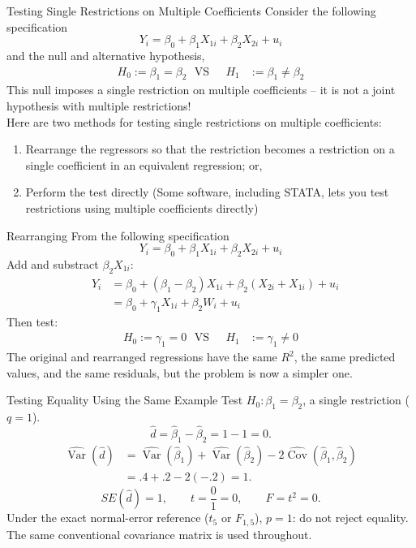 \documentclass[notes,10pt, aspectratio=169]{beamer}
\begin{document}
\begin{frame}{Testing Single Restrictions on Multiple Coefficients}
Consider the following specification
\begin{equation*}
    Y_i = \beta_0 + \beta_1 X_{1i}+ \beta_2 X_{2i} +u_i
\end{equation*}
and the null and alternative hypothesis,
\begin{eqnarray*}
    H_0 := \beta_1=\beta_2 \text{~~VS~~}  & H_1 &:= \beta_1\neq\beta_2
\end{eqnarray*}
This null imposes a single restriction on multiple coefficients – it is not a joint hypothesis with multiple restrictions!\\[1em]

Here are two methods for testing single restrictions on multiple coefficients:
\begin{enumerate}
    \item Rearrange the regressors so that the restriction becomes a restriction on a single coefficient in an equivalent regression; or,
    \item Perform the test directly (Some software, including STATA, lets you test restrictions using multiple coefficients directly)
\end{enumerate}
\end{frame}


\begin{frame}{Rearranging}
From the following specification
\begin{equation*}
    Y_i = \beta_0 + \beta_1 X_{1i}+ \beta_2 X_{2i} +u_i
\end{equation*}
Add and substract $ \beta_2 X_{1i}$:
\begin{eqnarray*}
    &Y_i &= \beta_0 + (\beta_1 - \beta_2)X_{1i}+ \beta_2 (X_{2i} + X_{1i}) +u_i\\
    & &= \beta_0 + \gamma_1 X_{1i}+ \beta_2 W_{i} +u_i
\end{eqnarray*}
Then test:
\begin{eqnarray*}
    H_0 := \gamma_1=0 \text{~~VS~~}  & H_1 &:= \gamma_1\neq 0
\end{eqnarray*}
The original and rearranged regressions have the same $R^2$, the same predicted values, and the same residuals, but the problem is now a simpler one.
\end{frame}


\begin{frame}{Testing Equality Using the Same Example}
Test $H_0:\beta_1=\beta_2$, a single restriction ($q=1$).
\[\hat d=\hat\beta_1-\hat\beta_2=1-1=0.\]
\begin{align*}
\widehat{\operatorname{Var}}(\hat d)
&=\widehat{\operatorname{Var}}(\hat\beta_1)+\widehat{\operatorname{Var}}(\hat\beta_2)
-2\widehat{\operatorname{Cov}}(\hat\beta_1,\hat\beta_2)\\
&=.4+.2-2(-.2)=1.
\end{align*}
\[SE(\hat d)=1,\qquad t=\frac01=0,\qquad F=t^2=0.\]
Under the exact normal-error reference ($t_5$ or $F_{1,5}$), $p=1$: do not reject equality. The same conventional covariance matrix is used throughout.
\end{frame}
\end{document}
